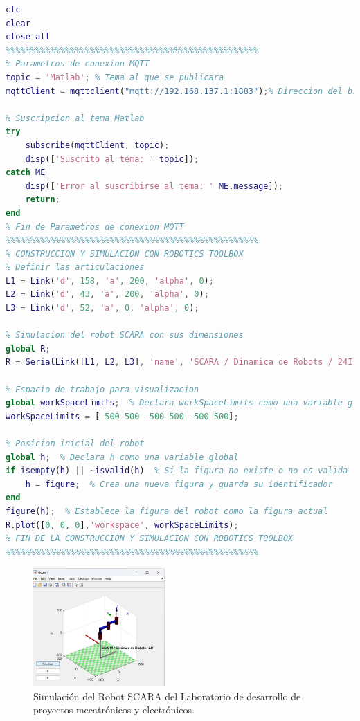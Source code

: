 \documentclass[final]{foresj}
\begin{document}
\begin{lstlisting}[language=Matlab]
clc
clear
close all
%%%%%%%%%%%%%%%%%%%%%%%%%%%%%%%%%%%%%%%%%%%%%%%%%%%
% Parametros de conexion MQTT
topic = 'Matlab'; % Tema al que se publicara
mqttClient = mqttclient("mqtt://192.168.137.1:1883");% Direccion del broker MQTT

% Suscripcion al tema Matlab
try
    subscribe(mqttClient, topic);
    disp(['Suscrito al tema: ' topic]);
catch ME
    disp(['Error al suscribirse al tema: ' ME.message]);
    return;
end
% Fin de Parametros de conexion MQTT
%%%%%%%%%%%%%%%%%%%%%%%%%%%%%%%%%%%%%%%%%%%%%%%%%%%
% CONSTRUCCION Y SIMULACION CON ROBOTICS TOOLBOX
% Definir las articulaciones
L1 = Link('d', 158, 'a', 200, 'alpha', 0);
L2 = Link('d', 43, 'a', 200, 'alpha', 0);
L3 = Link('d', 52, 'a', 0, 'alpha', 0);

% Simulacion del robot SCARA con sus dimensiones
global R;
R = SerialLink([L1, L2, L3], 'name', 'SCARA / Dinamica de Robots / 24I');

% Espacio de trabajo para visualizacion
global workSpaceLimits;  % Declara workSpaceLimits como una variable global
workSpaceLimits = [-500 500 -500 500 -500 500];

% Posicion inicial del robot
global h;  % Declara h como una variable global
if isempty(h) || ~isvalid(h)  % Si la figura no existe o no es valida
    h = figure;  % Crea una nueva figura y guarda su identificador
end
figure(h);  % Establece la figura del robot como la figura actual
R.plot([0, 0, 0],'workspace', workSpaceLimits);
% FIN DE LA CONSTRUCCION Y SIMULACION CON ROBOTICS TOOLBOX
%%%%%%%%%%%%%%%%%%%%%%%%%%%%%%%%%%%%%%%%%%%%%%%%%%%
\end{lstlisting}

\begin{figure}[h!]
\centering
\includegraphics[width=0.45\textwidth]{SCARA0.jpg}
\caption{Simulación del Robot SCARA del Laboratorio de desarrollo de proyectos mecatrónicos y electrónicos.}
\label{fig:my_label}
\end{figure}
\end{document}
